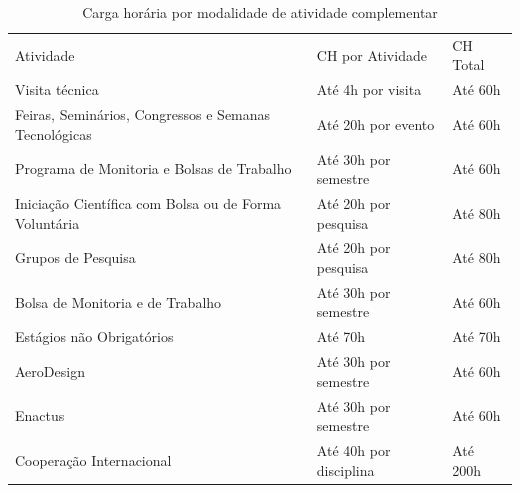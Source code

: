 \begin{longtable}{|p{8.5cm}|p{3.5cm}|p{2cm}|}
	
	\caption{Carga horária por modalidade de atividade complementar}\label{tab12} 
	
	\vspace{-0.25cm}
	
	
	\\ \hline 
	
	\cellcolor{\cinza}Atividade & \cellcolor{\cinza}CH por Atividade & \cellcolor{\cinza}CH Total \\ 
	
	\hline
	
	Visita técnica & Até 4h por visita & Até 60h \\ 
	
	\hline 
	
	Feiras, Seminários, Congressos e Semanas Tecnológicas & Até 20h por evento & Até 60h \\
	
	\hline
	
	Programa de Monitoria e Bolsas de Trabalho & Até 30h por semestre & Até 60h \\
	
	\hline
	
	Iniciação Científica com Bolsa ou de Forma Voluntária & Até 20h por pesquisa & Até 80h \\
	
	\hline
	
	Grupos de Pesquisa & Até 20h por pesquisa & Até 80h \\
	
	\hline
	
	Bolsa de Monitoria e de Trabalho & Até 30h por semestre & Até 60h \\
	
	\hline
	
	Estágios não Obrigatórios & Até 70h & Até 70h \\
	
	\hline
	
	AeroDesign & Até 30h por semestre & Até 60h \\ 
	
	\hline
	
	Enactus & Até 30h por semestre & Até 60h \\
	
	\hline
	
	Cooperação Internacional & Até 40h por disciplina & Até 200h\\
	

\end{longtable}

